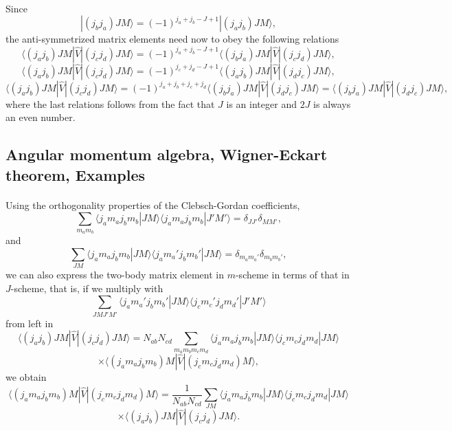 \documentclass[%
twoside,                 %
final,                   %
10pt]{article}
\begin{document}
\paragraph{}
Since
\[
|(j_bj_a)JM\rangle=(-1)^{j_a+j_b-J+1}|(j_aj_b)JM\rangle,
\]
the anti-symmetrized matrix elements need now to obey the following relations
\[
\langle (j_aj_b) JM | \hat{V} | (j_cj_d) JM \rangle = (-1)^{j_a+j_b-J+1}\langle (j_bj_a) JM | \hat{V} | (j_cj_d) JM \rangle,
\]
\[
\langle (j_aj_b) JM | \hat{V} | (j_cj_d) JM \rangle = (-1)^{j_c+j_d-J+1}\langle (j_aj_b) JM | \hat{V} | (j_dj_c) JM \rangle,
\]
\[
\langle (j_aj_b) JM | \hat{V} | (j_cj_d) JM \rangle = (-1)^{j_a+j_b+j_c+j_d}\langle (j_bj_a) JM | \hat{V} | (j_dj_c) JM \rangle=\langle (j_bj_a) JM | \hat{V} | (j_dj_c) JM \rangle,
\]
where the last relations follows from the fact that $J$ is an integer and $2J$ is always an even number.



\subsection{Angular momentum algebra, Wigner-Eckart theorem, Examples}

\paragraph{}
Using the orthogonality properties of the Clebsch-Gordan coefficients,
\[
\sum_{m_am_b}\langle j_am_aj_bm_b|JM\rangle\langle j_am_aj_bm_b|J'M'\rangle=\delta_{JJ'}\delta_{MM'},
\]
and
\[
\sum_{JM}\langle j_am_aj_bm_b|JM\rangle\langle j_am_a'j_bm_b'|JM\rangle=\delta_{m_am_a'}\delta_{m_bm_b'},
\]
we can also express the two-body matrix element in $m$-scheme in terms of that in $J$-scheme, that is, if we multiply with 
\[
\sum_{JMJ'M'}\langle j_am_a'j_bm_b'|JM\rangle\langle j_cm_c'j_dm_d'|J'M'\rangle
\]
from left in
\[
\langle (j_aj_b) JM | \hat{V} | (j_cj_d) JM \rangle = N_{ab}N_{cd}\sum_{m_am_bm_cm_d}\langle j_am_aj_bm_b|JM\rangle\langle j_cm_cj_dm_d|JM\rangle
\]
\[
\times \langle (j_am_aj_bm_b)M|  \hat{V} | (j_cm_cj_dm_d)M\rangle,
\]
we obtain
\[
\langle (j_am_aj_bm_b)M |  \hat{V} | (j_cm_cj_dm_d)M\rangle=\frac{1}{N_{ab}N_{cd}}\sum_{JM}\langle j_am_aj_bm_b|JM\rangle\langle j_cm_cj_dm_d|JM\rangle
\]
\[
\times \langle (j_aj_b) JM | \hat{V} | (j_cj_d) JM \rangle.
\]




\end{document}
